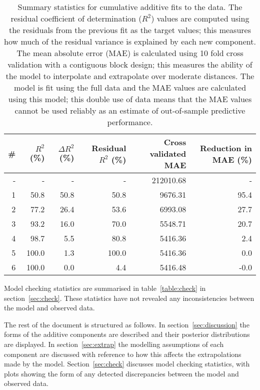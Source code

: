 \documentclass{article} %
\begin{document}
\begin{table}[htb]
\begin{center}
{\small
\begin{tabular}{|r|rrrrr|}
\hline
\bf{\#} & {$R^2$ (\%)} & {$\Delta R^2$ (\%)} & {Residual $R^2$ (\%)} & {Cross validated MAE} & Reduction in MAE (\%)\\
\hline
- & - & - & - & 212010.68 & -\\

1 & 50.8 & 50.8 & 50.8 & 9676.31 & 95.4\\

2 & 77.2 & 26.4 & 53.6 & 6993.08 & 27.7\\

3 & 93.2 & 16.0 & 70.0 & 5548.71 & 20.7\\

4 & 98.7 & 5.5 & 80.8 & 5416.36 & 2.4\\

5 & 100.0 & 1.3 & 100.0 & 5416.36 & 0.0\\

6 & 100.0 & 0.0 & 4.4 & 5416.48 & -0.0\\

\hline
\end{tabular}
\caption{
Summary statistics for cumulative additive fits to the data.
The residual coefficient of determination ($R^2$) values are computed using the residuals from the previous fit as the target values; this measures how much of the residual variance is explained by each new component.
The mean absolute error (MAE) is calculated using 10 fold cross validation with a contiguous block design; this measures the ability of the model to interpolate and extrapolate over moderate distances.
The model is fit using the full data and the MAE values are calculated using this model; this double use of data means that the MAE values cannot be used reliably as an estimate of out-of-sample predictive performance.
}
\label{table:stats}
}
\end{center}
\end{table}

Model checking statistics are summarised in table~\ref{table:check} in section~\ref{sec:check}.
These statistics have not revealed any inconsistencies between the model and observed data.

The rest of the document is structured as follows.
In section~\ref{sec:discussion} the forms of the additive components are described and their posterior distributions are displayed.
In section~\ref{sec:extrap} the modelling assumptions of each component are discussed with reference to how this affects the extrapolations made by the model.
Section~\ref{sec:check} discusses model checking statistics, with plots showing the form of any detected discrepancies between the model and observed data.
\end{document}
